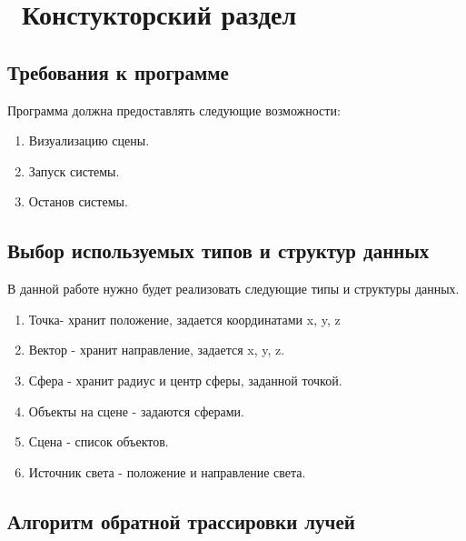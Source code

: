\chapter{ Констукторский раздел}
\label{cha:design}


\section{Требования к программе}

Программа должна предоставлять следующие возможности:
\begin{enumerate}
	\item Визуализацию сцены.
	\item Запуск системы.
	\item Останов системы.
\end{enumerate}

\section{Выбор используемых типов и структур данных}

В данной работе нужно будет реализовать следующие типы и структуры данных.
\begin{enumerate}
	\item Точка- хранит положение, задается координатами x, y, z 
	\item Вектор - хранит направление, задается x, y, z.
	\item Сфера - хранит радиус и центр сферы, заданной точкой.
	\item Объекты на сцене - задаются сферами.
	\item Сцена - список объектов.
	\item Источник света - положение и направление света.
\end{enumerate}

\section{Алгоритм обратной трассировки лучей}